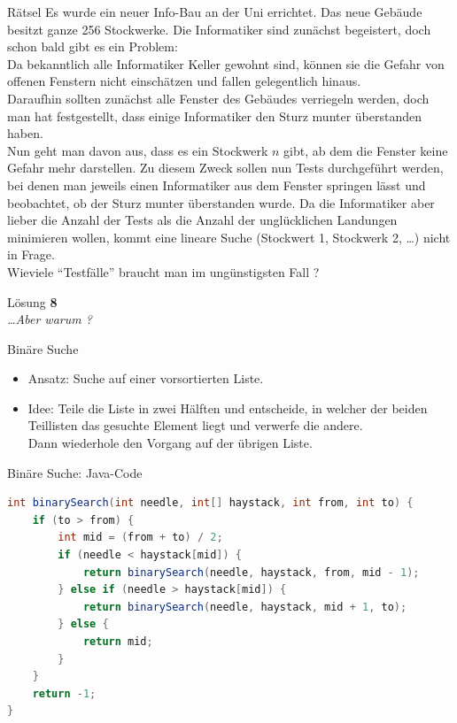 \documentclass[18pt]{beamer}
\newcommand{\quotes}[1]{``#1''}
\begin{document}
\begin{frame}{Rätsel}
    \small
    Es wurde ein neuer Info-Bau an der Uni errichtet. Das neue Gebäude besitzt ganze 256 Stockwerke.
    Die Informatiker sind zunächst begeistert, doch schon bald gibt es ein Problem:\\
    Da bekanntlich alle Informatiker Keller gewohnt sind, können sie die Gefahr von offenen Fenstern nicht einschätzen und fallen gelegentlich hinaus.\\
    Daraufhin sollten zunächst alle Fenster des Gebäudes verriegeln werden, doch man hat festgestellt, dass einige Informatiker den Sturz munter überstanden haben.\\
    Nun geht man davon aus, dass es ein Stockwerk $n$ gibt, ab dem die Fenster keine Gefahr mehr darstellen. Zu diesem Zweck sollen nun Tests durchgeführt werden,
    bei denen man jeweils einen Informatiker aus dem Fenster springen lässt und beobachtet, ob der Sturz munter überstanden wurde.
    Da die Informatiker aber lieber die Anzahl der Tests als die Anzahl der unglücklichen Landungen minimieren wollen, kommt eine lineare Suche (Stockwert 1, Stockwerk 2, \dots) nicht in Frage.\\
    \vspace{.2in}
    Wieviele \quotes{Testfälle} braucht man im ungünstigsten Fall ?
\end{frame}

\begin{frame}{Lösung}
    \Large{\textbf{8}}\\
    \pause
    \vspace{.4in}
    \large
    \textit{\dots Aber warum ?}
\end{frame}


\begin{frame}{Binäre Suche}
    \begin{itemize}
        \item Ansatz: Suche auf einer vorsortierten Liste.
        \item Idee: Teile die Liste in zwei Hälften und entscheide, in welcher der beiden Teillisten das gesuchte Element liegt und verwerfe die andere.\\
        Dann wiederhole den Vorgang auf der übrigen Liste.
    \end{itemize}
\end{frame}

\begin{frame}[fragile]{Binäre Suche: Java-Code}
    \begin{exampleblock}{}
        \begin{lstlisting}[language=Java,basicstyle=\scriptsize]
int binarySearch(int needle, int[] haystack, int from, int to) {
    if (to > from) {
        int mid = (from + to) / 2;
        if (needle < haystack[mid]) {
            return binarySearch(needle, haystack, from, mid - 1);
        } else if (needle > haystack[mid]) {
            return binarySearch(needle, haystack, mid + 1, to);
        } else {
            return mid;
        }
    }
    return -1;
}
        \end{lstlisting}
    \end{exampleblock}
\end{frame}
\end{document}
